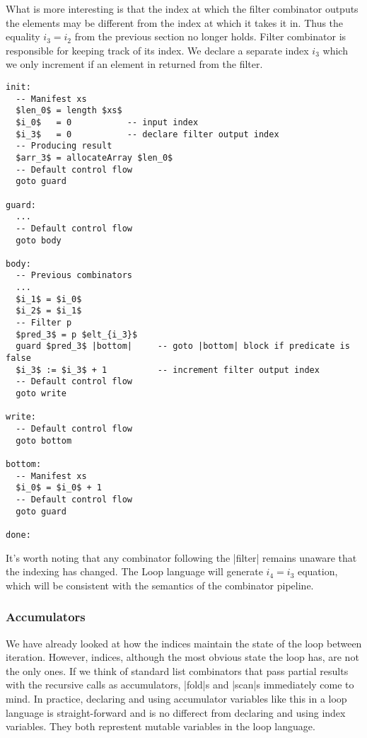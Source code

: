 What is more interesting is that the index at which the filter combinator outputs the elements may be different from the index at which it takes it in. Thus the equality $i_3 = i_2$ from the previous section no longer holds. Filter combinator is responsible for keeping track of its index. We declare a separate index $i_3$ which we only increment if an element in returned from the filter.

\begin{lstlisting}[mathescape]
init:
  -- Manifest xs
  $len_0$ = length $xs$
  $i_0$   = 0           -- input index
  $i_3$   = 0           -- declare filter output index
  -- Producing result
  $arr_3$ = allocateArray $len_0$
  -- Default control flow
  goto guard

guard:
  ...
  -- Default control flow
  goto body

body:
  -- Previous combinators
  ...
  $i_1$ = $i_0$
  $i_2$ = $i_1$
  -- Filter p
  $pred_3$ = p $elt_{i_3}$
  guard $pred_3$ |bottom|     -- goto |bottom| block if predicate is false
  $i_3$ := $i_3$ + 1          -- increment filter output index
  -- Default control flow
  goto write

write:
  -- Default control flow
  goto bottom

bottom:
  -- Manifest xs
  $i_0$ = $i_0$ + 1
  -- Default control flow
  goto guard

done:

\end{lstlisting}


It's worth noting that any combinator following the |filter| remains unaware that the indexing has changed. The Loop language will generate $i_4 = i_3$ equation, which will be consistent with the semantics of the combinator pipeline.



\subsubsection{Accumulators}

We have already looked at how the indices maintain the state of the loop between iteration. However, indices, although the most obvious state the loop has, are not the only ones. If we think of standard list combinators that pass partial results with the recursive calls as accumulators, |fold|s and |scan|s immediately come to mind. In practice, declaring and using accumulator variables like this in a loop language is straight-forward and is no differect from declaring and using index variables. They both represtent mutable variables in the loop language.

